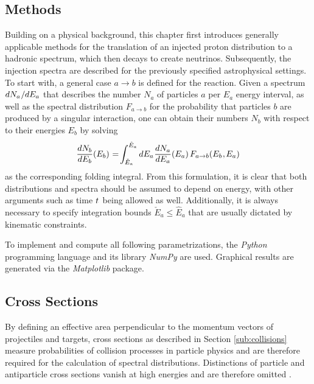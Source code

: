 \begin{spacing}{0.975}
	\chapter{Methods}
	\label{ch:methods}
	
	Building on a physical background, this chapter first introduces generally applicable methods for the translation of an
	injected proton distribution to a hadronic spectrum, which then decays to create neutrinos. Subsequently, the injection
	spectra are described for the previously specified astrophysical settings. To start with, a general case $a \rightarrow b$
	is defined for the reaction. Given a spectrum $dN_a \kern+0.5pt / \kern-0.25pt dE_a$ that describes the number $N_a$ of
	particles $a$ per $E_a$ energy interval, as well as the spectral distribution $F_{a \rightarrow b}$ for the probability
	that particles $b$ are produced by a singular interaction, one can obtain their numbers $N_b$ with respect to their
	energies $E_b$ by solving
	\begin{equation}
		\frac{dN_b}{\raisebox{0.5ex}{$dE_b$}} (E_b) \kern+0.5pt = \kern-1.5pt\int_{\check{E}_a}^{\hat{E}_a} dE_a
		\kern+0.5pt \frac{dN_a}{\raisebox{0.5ex}{$dE_a$}} (E_a) \kern+1.5pt F_{a \rightarrow b} (E_b \kern+0.5pt, \kern-0.5pt E_a)
		\label{eqn:folding}
	\end{equation}
	as the corresponding folding integral. From this formulation, it is clear that both distributions and spectra should be assumed
	to depend on energy, with other arguments such as time $t \kern+0.5pt$ being allowed as well. Additionally, it is always necessary
	to specify integration bounds $\check{E}_a \leq \hat{E}_a$ that are usually dictated by kinematic constraints.
	
	To implement and compute all following parametrizations, the \emph{Python} programming language and its library \emph{NumPy}
	are used. Graphical results are generated via the \emph{Matplotlib} package.
	
	
	
	\section{Cross Sections}
	\label{sec:cross}
	
	By defining an effective area perpendicular to the momentum vectors of projectiles and targets, cross sections as described
	in Section \ref{sub:collisions} measure probabilities of collision processes in particle physics and are therefore required
	for the calculation of spectral distributions. Distinctions of particle and antiparticle cross sections vanish at high
	energies and are therefore omitted \cite{pdg}.
	

\end{spacing}
